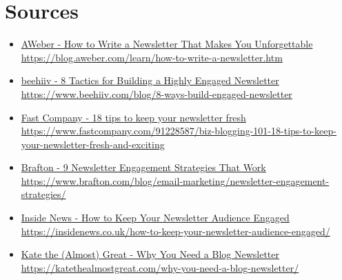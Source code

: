\documentclass[11pt]{article}
\begin{document}
\section*{Sources}
\begin{itemize}[label={},leftmargin=0.9em,itemsep=1pt]
\footnotesize
\item \href{https://blog.aweber.com/learn/how-to-write-a-newsletter.htm}{AWeber - How to Write a Newsletter That Makes You Unforgettable} \\ {\color{softgray}\url{https://blog.aweber.com/learn/how-to-write-a-newsletter.htm}}
\item \href{https://www.beehiiv.com/blog/8-ways-build-engaged-newsletter}{beehiiv - 8 Tactics for Building a Highly Engaged Newsletter} \\ {\color{softgray}\url{https://www.beehiiv.com/blog/8-ways-build-engaged-newsletter}}
\item \href{https://www.fastcompany.com/91228587/biz-blogging-101-18-tips-to-keep-your-newsletter-fresh-and-exciting}{Fast Company - 18 tips to keep your newsletter fresh} \\ {\color{softgray}\url{https://www.fastcompany.com/91228587/biz-blogging-101-18-tips-to-keep-your-newsletter-fresh-and-exciting}}
\item \href{https://www.brafton.com/blog/email-marketing/newsletter-engagement-strategies/}{Brafton - 9 Newsletter Engagement Strategies That Work} \\ {\color{softgray}\url{https://www.brafton.com/blog/email-marketing/newsletter-engagement-strategies/}}
\item \href{https://insidenews.co.uk/how-to-keep-your-newsletter-audience-engaged/}{Inside News - How to Keep Your Newsletter Audience Engaged} \\ {\color{softgray}\url{https://insidenews.co.uk/how-to-keep-your-newsletter-audience-engaged/}}
\item \href{https://katethealmostgreat.com/why-you-need-a-blog-newsletter/}{Kate the (Almost) Great - Why You Need a Blog Newsletter} \\ {\color{softgray}\url{https://katethealmostgreat.com/why-you-need-a-blog-newsletter/}}
\end{itemize}
\normalsize
\end{document}
